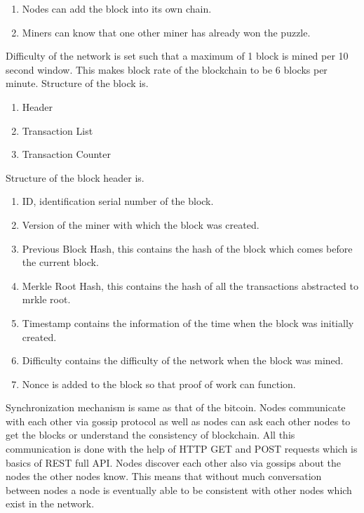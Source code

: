 \documentclass[conference]{IEEEtran}
\begin{document}
\begin{enumerate}
	\item Nodes can add the block into its own chain. 
	
	\item Miners can know that one other miner has already won the puzzle. 
\end{enumerate}
Difficulty of the network is set such that a maximum of 1 block is mined per 10 second window. This makes block rate of the blockchain to be 6 blocks per minute. 	
Structure of the block is. 
\begin{enumerate}
	\item Header 
	
	\item Transaction List 
	
	\item Transaction Counter
\end{enumerate}
Structure of the block header is. 
\begin{enumerate}
	\item ID, identification serial number of the block. 
	
	\item Version of the miner with which the block was created. 
	
	\item Previous Block Hash, this contains the hash of the block which comes before the current block. 
	
	\item Merkle Root Hash, this contains the hash of all the transactions abstracted to mrkle root. 
	
	\item Timestamp contains the information of the time when the block was initially created. 
	
	\item Difficulty contains the difficulty of the network when the block was mined. 
	
	\item Nonce is added to the block so that proof of work can function. 
\end{enumerate}




Synchronization mechanism is same as that of the bitcoin. Nodes communicate with each other via gossip protocol as well as nodes can ask each other nodes to get the blocks or understand the consistency of blockchain. All this communication is done with the help of HTTP GET and POST requests which is basics of REST full API. Nodes discover each other also via gossips about the nodes the other nodes know. This means that without much conversation between nodes a node is eventually able to be consistent with other nodes which exist in the network. 
\end{document}
